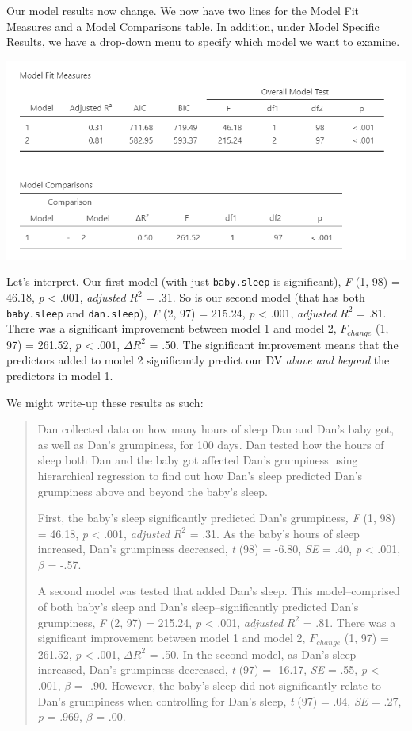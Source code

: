 \documentclass[
]{book}
\begin{document}
Our model results now change. We now have two lines for the Model Fit Measures and a Model Comparisons table. In addition, under Model Specific Results, we have a drop-down menu to specify which model we want to examine.

\includegraphics{images/13-regression/hierarchical-results.png}

Let's interpret. Our first model (with just \texttt{baby.sleep} is significant), \emph{F} (1, 98) = 46.18, \emph{p} \textless{} .001, \emph{adjusted} \(R^2\) = .31. So is our second model (that has both \texttt{baby.sleep} and \texttt{dan.sleep}),~\emph{F} (2, 97) = 215.24, \emph{p} \textless{} .001, \emph{adjusted} \(R^2\) = .81. There was a significant improvement between model 1 and model 2, \(F_{change}\) (1, 97) = 261.52, \emph{p} \textless{} .001, \(\Delta R^2\) = .50. The significant improvement means that the predictors added to model 2 significantly predict our DV \emph{above and beyond} the predictors in model 1.

We might write-up these results as such:

\begin{quote}
Dan collected data on how many hours of sleep Dan and Dan's baby got, as well as Dan's grumpiness, for 100 days. Dan tested how the hours of sleep both Dan and the baby got affected Dan's grumpiness using hierarchical regression to find out how Dan's sleep predicted Dan's grumpiness above and beyond the baby's sleep.

First, the baby's sleep significantly predicted Dan's grumpiness\emph{, F} (1, 98) = 46.18, \emph{p} \textless{} .001, \emph{adjusted} \(R^2\) = .31. As the baby's hours of sleep increased, Dan's grumpiness decreased, \emph{t} (98) = -6.80, \emph{SE} = .40, \emph{p} \textless{} .001, \(\beta\) = -.57.

A second model was tested that added Dan's sleep. This model--comprised of both baby's sleep and Dan's sleep--significantly predicted Dan's grumpiness, \emph{F} (2, 97) = 215.24, \emph{p} \textless{} .001, \emph{adjusted} \(R^2\) = .81. There was a significant improvement between model 1 and model 2, \(F_{change}\) (1, 97) = 261.52, \emph{p} \textless{} .001, \(\Delta R^2\) = .50. In the second model, as Dan's sleep increased, Dan's grumpiness decreased, \emph{t} (97) = -16.17, \emph{SE} = .55, \emph{p} \textless{} .001, \(\beta\) = -.90. However, the baby's sleep did not significantly relate to Dan's grumpiness when controlling for Dan's sleep, \emph{t} (97) = .04, \emph{SE} = .27, \emph{p} = .969, \(\beta\) = .00.
\end{quote}
\end{document}
